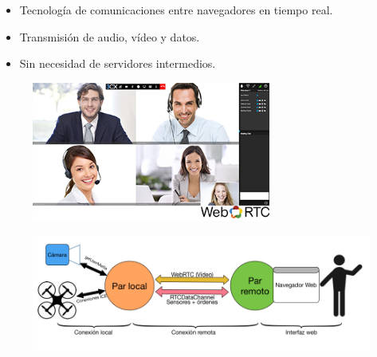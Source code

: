 \documentclass[notes,slidesec,a4]{seminar}
\begin{document}


\begin{hslide}
\begin{itemize}
\item Tecnología de comunicaciones entre navegadores en tiempo real.
\item Transmisión de audio, vídeo y datos.
\item Sin necesidad de servidores intermedios.
\end{itemize}
\begin{center}
\begin{figure}
\includegraphics[width=0.7\textwidth]{img/webrtc}
\end{figure}
\end{center}
\end{hslide}



\begin{hslide}
\begin{center}
\begin{figure}
\includegraphics[width=1.1\textwidth]{img/esquema_general}
\end{figure}
\end{center}
\end{hslide}



\end{document}
